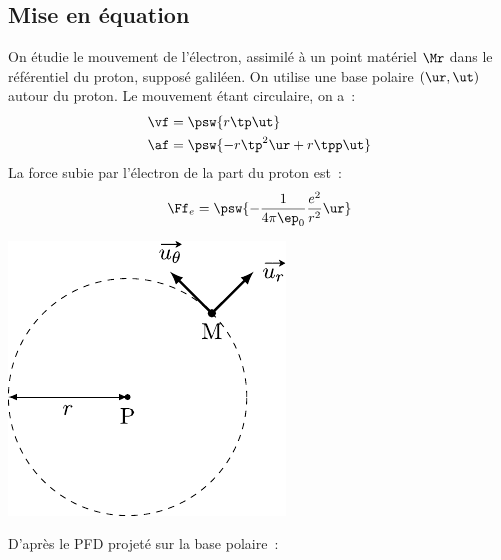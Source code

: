 \documentclass[../../main/main.tex]{subfiles}
\begin{document}
\subsection{Mise en équation}
\label{ssec:bohreq}
\noindent
\begin{minipage}[c]{.65\linewidth}
	On étudie le mouvement de l'électron, assimilé à un point matériel $\Mr$ dans le
	référentiel du proton, supposé galiléen. On utilise une base polaire $(\ur,\ut)$
	autour du proton.
	\bigbreak
	Le mouvement étant circulaire, on a~:
	\begin{align*}
		\vf & = \psw{r\tp \ut}
		\\
		\af & = \psw{-r\tp^2\ur + r \tpp \ut}
	\end{align*}
	La force subie par l'électron de la part du proton est~:
	\[
		\Ff_e = \psw{-\frac{1}{4\pi \ep_0}\frac{e^2}{r^2}\ur}
	\]
\end{minipage}
\hfill
\noindent
\begin{minipage}[c]{.33\linewidth}
	\begin{center}
		\includegraphics[width=\linewidth]{bohr_rota}
	\end{center}
\end{minipage}
D'après le PFD projeté sur la base polaire~:
\psw{%
	\[
		\left\{
		\begin{array}{rcl}
			-m_e r \tp^2 & = & - \frac{1}{4\pi\ep_0}\frac{e^2}{r^2}
			\\
			m_e r \tpp   & = & 0
		\end{array}
		\right.
		\qso
		\left\{
		\begin{array}{rcl}
			\tp & = & \sqrt{\frac{e^2}{4\pi\ep_0m_er^3}}
			\\
			\tp & = & \cte
		\end{array}
		\right.
	\]
}%
\end{document}
